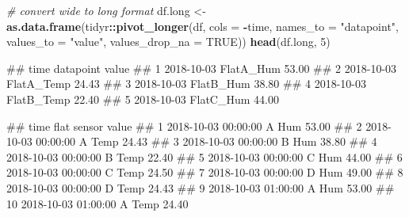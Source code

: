 \documentclass[
  a4paperpaper,
]{book}
\newenvironment{Shaded}{\begin{snugshade}}{\end{snugshade}}
\newcommand{\CommentTok}[1]{\textcolor[rgb]{0.56,0.35,0.01}{\textit{#1}}}
\newcommand{\DataTypeTok}[1]{\textcolor[rgb]{0.13,0.29,0.53}{#1}}
\newcommand{\DecValTok}[1]{\textcolor[rgb]{0.00,0.00,0.81}{#1}}
\newcommand{\KeywordTok}[1]{\textcolor[rgb]{0.13,0.29,0.53}{\textbf{#1}}}
\newcommand{\NormalTok}[1]{#1}
\newcommand{\OperatorTok}[1]{\textcolor[rgb]{0.81,0.36,0.00}{\textbf{#1}}}
\newcommand{\OtherTok}[1]{\textcolor[rgb]{0.56,0.35,0.01}{#1}}
\newcommand{\StringTok}[1]{\textcolor[rgb]{0.31,0.60,0.02}{#1}}
\let\oldShaded\Shaded
\let\endoldShaded\endShaded
\renewenvironment{Shaded}{\footnotesize\oldShaded}{\endoldShaded}
\let\oldverbatim\verbatim
\let\endoldverbatim\endverbatim
\renewenvironment{verbatim}{\footnotesize\oldverbatim}{\endoldverbatim}
\begin{document}
\begin{Shaded}
\begin{Highlighting}[]
\CommentTok{# convert wide to long format}
\NormalTok{df.long <-}\StringTok{ }\KeywordTok{as.data.frame}\NormalTok{(tidyr}\OperatorTok{::}\KeywordTok{pivot_longer}\NormalTok{(df,}
                                             \DataTypeTok{cols =} \OperatorTok{-}\NormalTok{time,}
                                             \DataTypeTok{names_to =} \StringTok{"datapoint"}\NormalTok{,}
                                             \DataTypeTok{values_to =} \StringTok{"value"}\NormalTok{,}
                                             \DataTypeTok{values_drop_na =} \OtherTok{TRUE}\NormalTok{))}
\KeywordTok{head}\NormalTok{(df.long, }\DecValTok{5}\NormalTok{)}
\end{Highlighting}
\end{Shaded}

\begin{verbatim}
##         time  datapoint value
## 1 2018-10-03  FlatA_Hum 53.00
## 2 2018-10-03 FlatA_Temp 24.43
## 3 2018-10-03  FlatB_Hum 38.80
## 4 2018-10-03 FlatB_Temp 22.40
## 5 2018-10-03  FlatC_Hum 44.00
\end{verbatim}

\begin{Shaded}
\end{Shaded}

\begin{verbatim}
##                   time flat sensor value
## 1  2018-10-03 00:00:00    A    Hum 53.00
## 2  2018-10-03 00:00:00    A   Temp 24.43
## 3  2018-10-03 00:00:00    B    Hum 38.80
## 4  2018-10-03 00:00:00    B   Temp 22.40
## 5  2018-10-03 00:00:00    C    Hum 44.00
## 6  2018-10-03 00:00:00    C   Temp 24.50
## 7  2018-10-03 00:00:00    D    Hum 49.00
## 8  2018-10-03 00:00:00    D   Temp 24.43
## 9  2018-10-03 01:00:00    A    Hum 53.00
## 10 2018-10-03 01:00:00    A   Temp 24.40
\end{verbatim}
\end{document}
